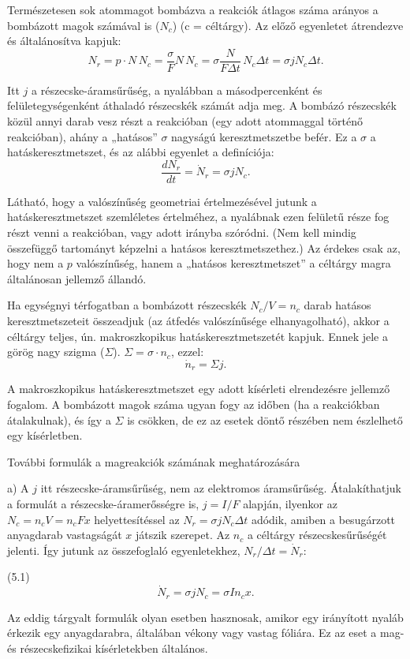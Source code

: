 \documentclass[../main.tex]{subfiles}
\begin{document}
Természetesen sok atommagot bombázva a reakciók átlagos száma arányos
a bombázott magok számával is ($N_c$) (c = céltárgy).
Az előző egyenletet átrendezve és általánosítva kapjuk:
\[
N_r = p\cdot N\,N_c = \frac{\sigma}{F }N\,N_c
= \sigma\frac{N}{F \Delta t}\,N_c \Delta t = \sigma j N_c \Delta t.
\]

Itt $j$ a részecske-áramsűrűség, a nyalábban a másodpercenként és
felületegységenként áthaladó részecskék számát adja meg.
A bombázó részecskék közül annyi darab vesz részt a reakcióban (egy adott atommaggal történő
reakcióban), ahány a „hatásos” $\sigma$ nagyságú keresztmetszetbe befér.
Ez a $\sigma$ a hatáskeresztmetszet, és az alábbi egyenlet a definíciója:
\[
\frac{dN_r}{dt}=\dot{N}_r=\sigma j N_c.
\]

Látható, hogy a valószínűség geometriai értelmezésével jutunk a
hatáskeresztmetszet szemléletes értelméhez, a nyalábnak ezen felületű
része fog részt venni a reakcióban, vagy adott irányba szóródni.
(Nem kell mindig összefüggő tartományt képzelni a hatásos keresztmetszethez.)
Az érdekes csak az, hogy nem a $p$ valószínűség, hanem a „hatásos
keresztmetszet” a céltárgy magra általánosan jellemző állandó.

Ha egységnyi térfogatban a bombázott részecskék $N_c/V=n_c$ darab
hatásos keresztmetszeteit összeadjuk (az átfedés valószínűsége
elhanyagolható), akkor a céltárgy teljes, ún. makroszkopikus
hatáskeresztmetszetét kapjuk.
Ennek jele a görög nagy szigma ($\Sigma$).
$\Sigma=\sigma\cdot n_c$, ezzel:
\[
\dot{n}_r=\Sigma j.
\]

A makroszkopikus hatáskeresztmetszet egy adott kísérleti elrendezésre
jellemző fogalom.
A bombázott magok száma ugyan fogy az időben (ha a reakciókban
átalakulnak), és így a $\Sigma$ is csökken, de ez az esetek döntő részében
nem észlelhető egy kísérletben.

További formulák a magreakciók számának meghatározására

a) A $j$ itt részecske-áramsűrűség, nem az elektromos áramsűrűség.
Átalakíthatjuk a formulát a részecske-áramerősségre is, $j=I/F$ alapján,
ilyenkor az $N_c=n_c V=n_c F x$ helyettesítéssel az
$N_r=\sigma j N_c \Delta t$ adódik, amiben a besugárzott anyagdarab
vastagságát $x$ játszik szerepet.
Az $n_c$ a céltárgy részecskesűrűségét jelenti.
Így jutunk az összefoglaló egyenletekhez, $N_r/\Delta t=\dot{N}_r$:

(5.1)
\[
\dot{N}_r=\sigma j N_c=\sigma I n_c x.
\]

Az eddig tárgyalt formulák olyan esetben hasznosak, amikor egy
irányított nyaláb érkezik egy anyagdarabra, általában vékony vagy vastag
fóliára.
Ez az eset a mag- és részecskefizikai kísérletekben általános.
\end{document}
